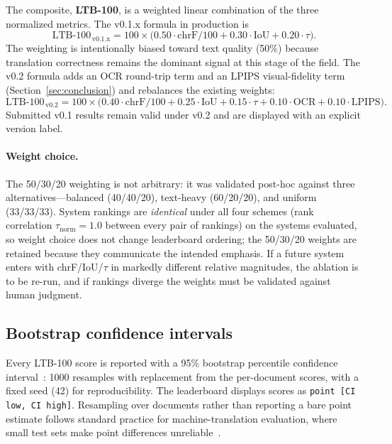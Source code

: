 \documentclass[11pt]{article}
\begin{document}
The composite, \textbf{LTB-100}, is a weighted linear combination of the three
normalized metrics. The v0.1.x formula in production is
\begin{equation}
\mathrm{LTB\text{-}100}_{\,\mathrm{v0.1.x}}
= 100 \times \big(0.50 \cdot \mathrm{chrF}/100
+ 0.30 \cdot \mathrm{IoU}
+ 0.20 \cdot \tau \big).
\label{eq:ltb100v01}
\end{equation}
The weighting is intentionally biased toward text quality (50\%) because
translation correctness remains the dominant signal at this stage of the field.
The v0.2 formula adds an OCR round-trip term and an LPIPS visual-fidelity term
(Section~\ref{sec:conclusion}) and rebalances the existing weights:
\begin{equation}
\mathrm{LTB\text{-}100}_{\,\mathrm{v0.2}}
= 100 \times \big(0.40 \cdot \mathrm{chrF}/100
+ 0.25 \cdot \mathrm{IoU}
+ 0.15 \cdot \tau
+ 0.10 \cdot \mathrm{OCR}
+ 0.10 \cdot \mathrm{LPIPS} \big).
\label{eq:ltb100v02}
\end{equation}
Submitted v0.1 results remain valid under v0.2 and are displayed with an
explicit version label.

\paragraph{Weight choice.} The 50/30/20 weighting is not arbitrary: it was
validated post-hoc against three alternatives---balanced (40/40/20),
text-heavy (60/20/20), and uniform (33/33/33). System rankings are
\emph{identical} under all four schemes (rank correlation
$\tau_{\mathrm{norm}}=1.0$ between every pair of rankings) on the systems
evaluated, so weight choice does not change leaderboard ordering; the 50/30/20
weights are retained because they communicate the intended emphasis. If a future
system enters with chrF/IoU/$\tau$ in markedly different relative magnitudes,
the ablation is to be re-run, and if rankings diverge the weights must be
validated against human judgment.

\subsection{Bootstrap confidence intervals}

Every LTB-100 score is reported with a 95\% bootstrap percentile confidence
interval~\citep{efron1979bootstrap}: 1000 resamples with replacement from the
per-document scores, with a fixed seed (42) for reproducibility. The leaderboard
displays scores as \texttt{point [CI low, CI high]}. Resampling over documents
rather than reporting a bare point estimate follows standard practice for
machine-translation evaluation, where small test sets make point differences
unreliable~\citep{koehn2004statistical}.
\end{document}
